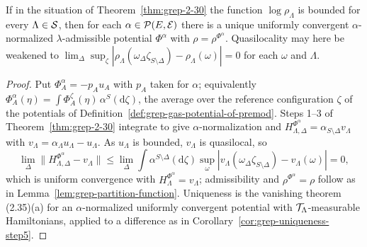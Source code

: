 \begin{theorem}
    \label{thm:grep-2-30-normalized}
    \leanok

    If in the situation of Theorem~\ref{thm:grep-2-30} the function $\log \rho_\Lambda$ is bounded
    for every $\Lambda \in \mathcal{S}$, then for each $\alpha \in \mathcal{P}(E,\mathcal{E})$ there is a unique
    uniformly convergent $\alpha$-normalized $\lambda$-admissible potential $\Phi^\alpha$ with
    $\rho = \rho^{\Phi^\alpha}$.  Quasilocality may here be weakened to
    $\lim_\Delta \sup_{\zeta} |\rho_\Lambda(\omega_\Delta \zeta_{S\setminus\Delta}) - \rho_\Lambda(\omega)| = 0$
    for each $\omega$ and $\Lambda$.
\end{theorem}
\begin{proof}
    \leanok

    Put $\Phi^\alpha_A = -p_A u_A$ with $p_A$ taken for $\alpha$; equivalently
    $\Phi^\alpha_A(\eta) = \int \Phi^\zeta_A(\eta)\,\alpha^S(\mathrm{d}\zeta)$, the average over
    the reference configuration $\zeta$ of the potentials of
    Definition~\ref{def:grep-gas-potential-of-premod}.  Steps 1--3 of
    Theorem~\ref{thm:grep-2-30} integrate to give $\alpha$-normalization and
    $H^{\Phi^\alpha}_{\Lambda,\Delta} = \alpha_{S\setminus\Delta} v_\Lambda$ with
    $v_\Lambda = \alpha_\Lambda u_\Lambda - u_\Lambda$.  As $u_\Lambda$ is bounded, $v_\Lambda$ is
    quasilocal, so
    \[
        \lim_\Delta \|H^{\Phi^\alpha}_{\Lambda,\Delta} - v_\Lambda\| \leq \lim_\Delta \int \alpha^{S\setminus\Delta}(\mathrm{d}\zeta)\sup_\omega |v_\Lambda(\omega_\Delta \zeta_{S\setminus\Delta}) - v_\Lambda(\omega)| = 0 ,
    \]
    which is uniform convergence with $H^{\Phi^\alpha}_\Lambda = v_\Lambda$; admissibility and
    $\rho^{\Phi^\alpha} = \rho$ follow as in Lemma~\ref{lem:grep-partition-function}.  Uniqueness
    is the vanishing theorem (2.35)(a) for an $\alpha$-normalized uniformly convergent potential
    with $\mathcal{T}_\Lambda$-measurable Hamiltonians, applied to a difference as in
    Corollary~\ref{cor:grep-uniqueness-step5}.
\end{proof}

